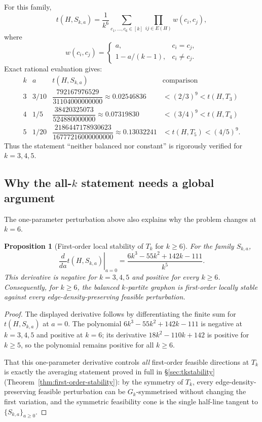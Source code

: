 \documentclass[11pt]{amsart}
\newtheorem{proposition}[theorem]{Proposition}
\theoremstyle{definition}
\newcommand{\1}{\mathbf 1}
\begin{document}
For this family,
\[
   t(H,S_{k,a})=\frac1{k^6}\sum_{c_1,\ldots,c_6\in[k]}
        \prod_{ij\in E(H)}w(c_i,c_j),
\]
where
\[
   w(c_i,c_j)=
   \begin{cases}
      a, & c_i=c_j,\\
      1-a/(k-1), & c_i\ne c_j.
   \end{cases}
\]
Exact rational evaluation gives:
\[
\begin{array}{c|c|c|c}
 k & a & t(H,S_{k,a}) & \text{comparison}\\ \hline
 3 & 3/10 & \dfrac{792167976529}{31104000000000}\approx 0.02546836
   & <(2/3)^9<t(H,T_3)\\[2mm]
 4 & 1/5 & \dfrac{38420325073}{524880000000}\approx 0.07319830
   & <(3/4)^9<t(H,T_4)\\[2mm]
 5 & 1/20 & \dfrac{2186447178930623}{16777216000000000}\approx 0.13032241
   & <t(H,T_5)<(4/5)^9.
\end{array}
\]
Thus the statement ``neither balanced nor constant'' is rigorously verified for
$k=3,4,5$.

\subsection{Why the all-$k$ statement needs a global argument}

The one-parameter perturbation above also explains why the problem changes at
$k=6$.

\begin{proposition}[First-order local stability of $T_k$ for $k\ge 6$]
\label{prop:tk-stability-short}
For the family $S_{k,a}$,
\[
   \left.\frac{d}{da}t(H,S_{k,a})\right|_{a=0}
   =\frac{6k^3-55k^2+142k-111}{k^5}.
\]
This derivative is negative for $k=3,4,5$ and positive for every $k\ge 6$.
Consequently, for $k\ge 6$, the balanced $k$-partite graphon is first-order
locally stable against every edge-density-preserving feasible perturbation.
\end{proposition}

\begin{proof}
The displayed derivative follows by differentiating the finite sum for
$t(H,S_{k,a})$ at $a=0$.  The polynomial $6k^3-55k^2+142k-111$ is negative at
$k=3,4,5$ and positive at $k=6$; its derivative $18k^2-110k+142$ is positive for
$k\ge 5$, so the polynomial remains positive for all $k\ge 6$.

That this one-parameter derivative controls \emph{all} first-order feasible
directions at $T_k$ is exactly the averaging statement proved in full in
\S\ref{sec:tkstability} (Theorem~\ref{thm:first-order-stability}): by the
symmetry of $T_k$, every edge-density-preserving feasible perturbation can be
$G_k$-symmetrised without changing the first variation, and the symmetric
feasibility cone is the single half-line tangent to $\{S_{k,a}\}_{a\ge0}$.
\end{proof}
\end{document}
